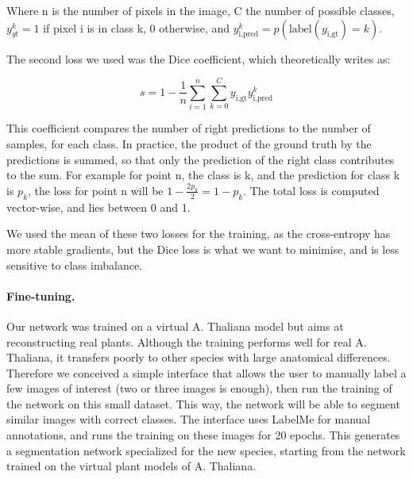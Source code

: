 Where n is the number of pixels in the image, C the number of possible
classes, $y_{gt}^k = 1$ if pixel i is in class k, 0 otherwise, and
$y_ {\textrm{i}, \textrm{pred}}^k = p(\textrm{label}(y_{\textrm{i},
\textrm{gt}}) = k)$.

The second loss we used was the Dice coefficient, which theoretically
writes as:

\begin{equation}
    s = 1 - \frac{1}{n}\sum_{i=1}^n\sum_{k=0}^{C}y_{\textrm{i},
    \textrm{gt}} y_{\textrm{i}, \textrm{pred}}^k
\end{equation}


This coefficient compares the number of right predictions to the
number of samples, for each class. In practice, the product of the
ground truth by the predictions is summed, so that only the prediction
of the right class contributes to the sum. For example for point n,
the class is k, and the prediction for class k is $p_k$, the loss
for point n will be $1 - \frac{2p_k}{2} = 1 - p_k$. The total loss
is computed vector-wise, and lies between 0 and 1.


We used the mean of these two losses for the training, as the
cross-entropy has more stable gradients, but the Dice loss is what we
want to minimise, and is less sensitive to class imbalance.


\paragraph{Fine-tuning.} Our network was trained on a virtual A.
Thaliana model but aims at reconstructing real plants. Although the training performs well for real A. Thaliana, it transfers poorly to other species with large anatomical differences. Therefore we
conceived a simple interface that allows the user to manually label a
few images of interest (two or three images is enough), then run the training
of the network on this small dataset. This way, the network will be
able to segment similar images with correct classes.
The interface uses LabelMe \cite{russell_labelme:_2008} for manual annotations, and runs the training on these images for 20 epochs. This generates a segmentation network specialized for the new species,
starting from the network trained on the virtual plant models of A. Thaliana.

